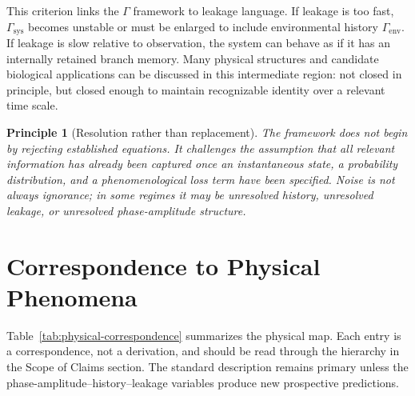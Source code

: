 \documentclass[11pt,a4paper]{article}
\newtheorem{principle}{Principle}
\newcommand{\Ghist}{\Gamma}
\begin{document}
This criterion links the \(\Ghist\) framework to leakage language.  If leakage is too fast, \(\Ghist_{\mathrm{sys}}\) becomes unstable or must be enlarged to include environmental history \(\Ghist_{\mathrm{env}}\).  If leakage is slow relative to observation, the system can behave as if it has an internally retained branch memory.  Many physical structures and candidate biological applications can be discussed in this intermediate region: not closed in principle, but closed enough to maintain recognizable identity over a relevant time scale.

\begin{principle}[Resolution rather than replacement]
The framework does not begin by rejecting established equations.  It challenges the assumption that all relevant information has already been captured once an instantaneous state, a probability distribution, and a phenomenological loss term have been specified.  Noise is not always ignorance; in some regimes it may be unresolved history, unresolved leakage, or unresolved phase-amplitude structure.
\end{principle}

\section{Correspondence to Physical Phenomena}
Table~\ref{tab:physical-correspondence} summarizes the physical map.  Each entry is a correspondence, not a derivation, and should be read through the hierarchy in the Scope of Claims section.  The standard description remains primary unless the phase-amplitude--history--leakage variables produce new prospective predictions.
\end{document}
